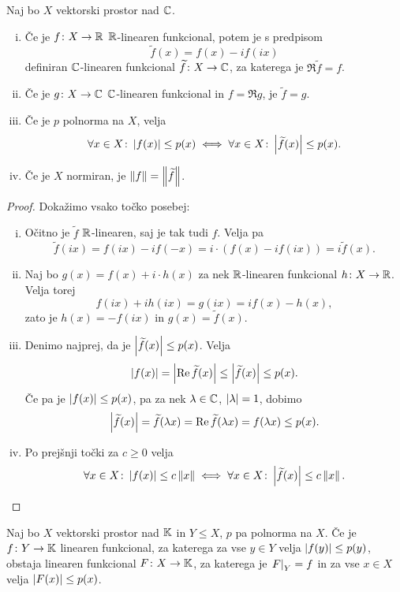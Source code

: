 \begin{lema}\label{lm:hb:1}
Naj bo $X$ vektorski prostor nad $\mathbb{C}$.

\begin{enumerate}[i)]
\item Če je $f \colon X \to \mathbb{R}$ $\mathbb{R}$-linearen funkcional, potem je
s predpisom
\[
\widetilde{f}(x) = f(x) - if(ix)
\]
definiran $\mathbb{C}$-linearen funkcional $\widetilde{f} \colon X \to \mathbb{C}$,
za katerega je $\Re \widetilde{f} = f$.
\item Če je $g \colon X \to \mathbb{C}$ $\mathbb{C}$-linearen funkcional in
$f = \Re g$, je $\widetilde{f} = g$.
\item Če je $p$ polnorma na $X$, velja
\[
\forall x \in X \colon \left\lvert f(x)\right\rvert \leq p(x) \iff
\forall x \in X \colon \left\lvert \widetilde{f}(x)\right\rvert \leq p(x).
\]
\item Če je $X$ normiran, je $\left\lVert f\right\rVert = \left\lVert \widetilde{f}\right\rVert$.
\end{enumerate}
\end{lema}

\begin{proof}
Dokažimo vsako točko posebej:

\begin{enumerate}[i)]
\item Očitno je $\widetilde{f}$ $\mathbb{R}$-linearen, saj je tak tudi $f$.
Velja pa
\[
\widetilde{f}(ix) = f(ix) - if(-x) =
i \cdot (f(x)-if(ix)) = i \widetilde{f}(x).
\]
\item Naj bo $g(x) = f(x) + i \cdot h(x)$ za nek $\mathbb{R}$-linearen
funkcional $h \colon X \to \mathbb{R}$. Velja torej
\[
f(ix) + ih(ix) = g(ix) = if(x) - h(x),
\]
zato je $h(x) = -f(ix)$ in $g(x) = \widetilde{f}(x)$.
\item Denimo najprej, da je $\left\lvert \widetilde{f}(x)\right\rvert \leq p(x)$.
Velja
\[
\left\lvert f(x)\right\rvert = \left\lvert \operatorname{Re} \widetilde{f}(x)\right\rvert \leq
\left\lvert \widetilde{f}(x)\right\rvert \leq p(x).
\]
Če pa je $\left\lvert f(x)\right\rvert \leq p(x)$, pa za nek $\lambda \in \mathbb{C}$,
$\left\lvert \lambda\right\rvert = 1$, dobimo
\[
\left\lvert \widetilde{f}(x)\right\rvert = \widetilde{f}(\lambda x) =
\operatorname{Re} \widetilde{f}(\lambda x) = f(\lambda x) \leq p(x).
\]
\item Po prejšnji točki za $c \geq 0$ velja
\[
\forall x \in X \colon \left\lvert f(x)\right\rvert \leq c \left\lVert x\right\rVert \iff
\forall x \in X \colon \left\lvert \widetilde{f}(x)\right\rvert \leq c \left\lVert x\right\rVert.
\qedhere
\]
\end{enumerate}
\end{proof}

\begin{izrek}
\label{iz:hb:2}
Naj bo $X$ vektorski prostor nad $\mathbb{K}$ in $Y \leq X$, $p$ pa
polnorma na $X$. Če je $f \colon Y \to \mathbb{K}$ linearen funkcional, za
katerega za vse $y \in Y$ velja $\left\lvert f(y)\right\rvert \leq p(y)$, obstaja
linearen funkcional $F \colon X \to \mathbb{K}$, za katerega je
$\left. F\right|_{Y}^{} = f$ in za vse $x \in X$ velja
$\left\lvert F(x)\right\rvert \leq p(x)$.
\end{izrek}

